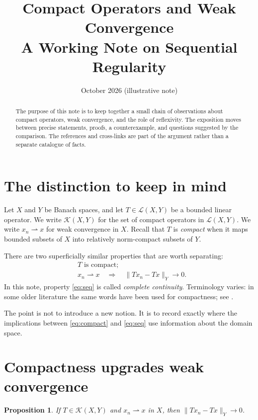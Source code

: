 \documentclass[11pt,a4paper]{article}
\title{Compact Operators and Weak Convergence\\
       \large A Working Note on Sequential Regularity}
\author{}
\date{October 2026 \quad (illustrative note)}
\newtheorem{proposition}[proposition]{Proposition}
\theoremstyle{definition}
\theoremstyle{remark}
\newcommand{\cL}{\mathcal{L}}
\newcommand{\cK}{\mathcal{K}}
\newcommand{\weakto}{\rightharpoonup}
\begin{document}
\maketitle

\begin{abstract}
The purpose of this note is to keep together a small chain of observations
about compact operators, weak convergence, and the role of reflexivity.
The exposition moves between precise statements, proofs, a counterexample,
and questions suggested by the comparison.  The references and cross-links
are part of the argument rather than a separate catalogue of facts.
\end{abstract}

\tableofcontents

\section{The distinction to keep in mind}\label{sec:setting}

Let $X$ and $Y$ be Banach spaces, and let $T\in\cL(X,Y)$ be a bounded
linear operator.  We write $\cK(X,Y)$ for the set of compact operators
in $\cL(X,Y)$.  We write $x_n\weakto x$ for weak convergence in $X$.
Recall that $T$ is \emph{compact} when it maps bounded subsets of $X$
into relatively norm-compact subsets of $Y$.

There are two superficially similar properties that are worth separating:
\begin{align}
  & T\text{ is compact}; \label{eq:compact}\tag{C}\\
  & x_n\weakto x\quad\Longrightarrow\quad
       \|Tx_n-Tx\|_Y\longrightarrow 0.\label{eq:seq}\tag{S}
\end{align}
In this note, property \eqref{eq:seq} is called \emph{complete continuity}.
Terminology varies: in some older literature the same words have been
used for compactness; see \cite{eom}.

The point is not to introduce a new notion.  It is to record exactly
where the implications between \eqref{eq:compact} and \eqref{eq:seq}
use information about the domain space.

\section{Compactness upgrades weak convergence}\label{sec:forward}

\begin{proposition}\label{prop:compact-to-strong}
If $T\in\cK(X,Y)$ and $x_n\weakto x$ in $X$, then
$\|Tx_n-Tx\|_Y\to 0$.
\end{proposition}
\end{document}
